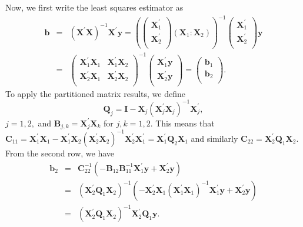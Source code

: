 Now, we first write the least squares estimator as
\begin{eqnarray*}
\mathbf{b} &=& \left( \mathbf{X}^{\prime}\mathbf{X}\right)^{-1}
\mathbf{X}^{\prime} \mathbf{y} = \left( \left(
  \begin{array}{c}
    \mathbf{X}_1^{\prime} \\
    \mathbf{X}_2^{\prime} \\
  \end{array}
\right)
 \left( \mathbf{X}_1 : \mathbf{X}_2 \right)\right)^{-1}
\left(
  \begin{array}{c}
    \mathbf{X}_1^{\prime} \\
    \mathbf{X}_2^{\prime} \\
  \end{array}
\right) \mathbf{y} \\
&=& \left(
  \begin{array}{cc}
    \mathbf{X}_1^{\prime} \mathbf{X}_1 &\mathbf{X}_1^{\prime} \mathbf{X}_2  \\
   \mathbf{X}_2^{\prime} \mathbf{X}_1  & \mathbf{X}_2^{\prime} \mathbf{X}_2  \\
  \end{array}
 \right)^{-1}
\left(
  \begin{array}{c}
    \mathbf{X}_1^{\prime}  \mathbf{y}\\
    \mathbf{X}_2^{\prime}  \mathbf{y}\\
  \end{array}
\right) = \left(
  \begin{array}{c}
    \mathbf{b}_1\\
    \mathbf{b}_2\\
  \end{array}
\right) .
\end{eqnarray*}
To apply the partitioned matrix results, we define
\begin{equation*}
\mathbf{Q}_j = \mathbf{I} - \mathbf{X}_j
\left(\mathbf{X}_j^{\prime}\mathbf{X}_j \right)^{-1}
\mathbf{X}_j^{\prime} ,
\end{equation*}
$j=1,2,$ and $\mathbf{B}_{j,k} =  \mathbf{X}_j^{\prime}\mathbf{X}_k$ for
$j,k=1,2.$ This means that $\mathbf{C}_{11}=\mathbf{X}_1^{\prime}\mathbf{X}_1 -
\mathbf{X}_1^{\prime}\mathbf{X}_2
(\mathbf{X}_2^{\prime}\mathbf{X}_2)^{-1}
\mathbf{X}_2^{\prime}\mathbf{X}_1^{\prime } = \mathbf{X}_1^{\prime}
\mathbf{Q}_2 \mathbf{X}_1 $ and similarly $\mathbf{C}_{22} =
\mathbf{X}_2^{\prime} \mathbf{Q}_1 \mathbf{X}_2 $. From the second row,
we have
\begin{eqnarray*}
\mathbf{b}_2 &=& \mathbf{C}_{22}^{-1} \left( -\mathbf{B}_{12}
\mathbf{B}_{11}^{-1}\mathbf{X}_1^{\prime}  \mathbf{y} +
\mathbf{X}_2^{\prime}  \mathbf{y} \right)\\
&=& \left(\mathbf{X}_2^{\prime} \mathbf{Q}_1 \mathbf{X}_2
\right)^{-1} \left( - \mathbf{X}_2^{\prime} \mathbf{X}_1
(\mathbf{X}_1^{\prime}\mathbf{X}_1)^{-1} \mathbf{X}_1^{\prime}
\mathbf{y} + \mathbf{X}_2^{\prime}\mathbf{y}  \right) \\
&=& \left(\mathbf{X}_2^{\prime} \mathbf{Q}_1 \mathbf{X}_2
\right)^{-1} \mathbf{X}_2^{\prime} \mathbf{Q}_1\mathbf{y} .
\end{eqnarray*}
